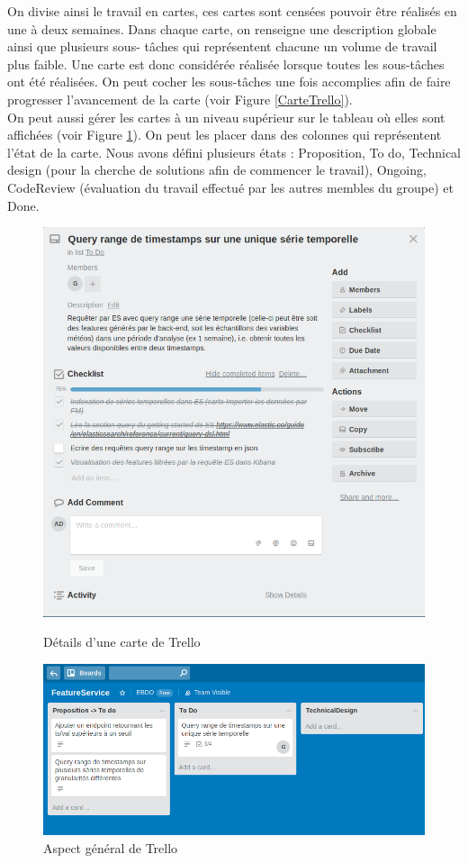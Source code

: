\documentclass[a4paper]{article}
\begin{document}
On divise ainsi le travail en cartes, ces cartes sont censées pouvoir être réalisés en une à deux
semaines. Dans chaque carte, on renseigne une description globale ainsi que plusieurs sous-
tâches qui représentent chacune un volume de travail plus faible. Une carte est donc considérée
réalisée lorsque toutes les sous-tâches ont été réalisées. On peut cocher les sous-tâches une fois
accomplies afin de faire progresser l’avancement de la carte (voir Figure \ref{CarteTrello}).
\\

On peut aussi gérer les cartes à un niveau supérieur sur le tableau où elles sont affichées (voir Figure \ref{TabTrello}).
On peut les placer dans des colonnes qui représentent l’état de la carte. Nous avons
défini plusieurs états : Proposition, To do, Technical design (pour la cherche de solutions afin de
commencer le travail), Ongoing, CodeReview (évaluation du travail effectué par les autres
membles du groupe) et Done.

\begin{figure}[!htb]
\begin{minipage}{0.48\textwidth}
	\centering
	\includegraphics[width=.7\linewidth]{./tmp/CarteTrello.png}
	\caption{Détails d'une carte de Trello\label{CarteTrello}}
\end{minipage}\hfill
\begin {minipage}{0.48\textwidth}
\centering
\includegraphics[width=.7\linewidth]{./tmp/Trello.png}
\caption{Aspect général de Trello\label{TabTrello}}
\end{minipage}
\end{figure}
\end{document}
